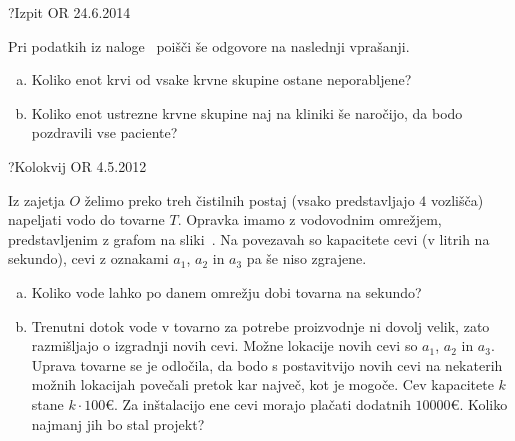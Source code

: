 \begin{naloga}{?}{Izpit OR 24.6.2014}
\begin{vprasanje}
Pri podatkih iz naloge~ poišči še odgovore na naslednji vprašanji.
\begin{enumerate}[(a)]
\item Koliko enot krvi od vsake krvne skupine ostane neporabljene?
\item Koliko enot ustrezne krvne skupine naj na kliniki še naročijo,
da bodo pozdravili vse paciente?
\end{enumerate}
\end{vprasanje}
\begin{odgovor}
\end{odgovor}
\end{naloga}


\begin{naloga}{?}{Kolokvij OR 4.5.2012}
\begin{vprasanje}[zajetje]
Iz zajetja $O$ želimo preko treh čistilnih postaj
(vsako predstavljajo $4$ vozlišča)
napeljati vodo do tovarne $T$.
Opravka imamo z vodovodnim omrežjem,
pred\-stav\-lje\-nim z grafom na sliki~\fig{}.
Na povezavah so kapacitete cevi (v litrih na sekundo),
cevi z oznakami $a_1$, $a_2$ in $a_3$ pa še niso zgrajene.

\begin{enumerate}[(a)]
\item Koliko vode lahko po danem omrežju dobi tovarna na sekundo?

\item Trenutni dotok vode v tovarno za potrebe proizvodnje ni dovolj velik,
zato razmišljajo o izgradnji novih cevi.
Možne lokacije novih cevi so $a_1$, $a_2$ in $a_3$.
Uprava tovarne se je odločila,
da bodo s postavitvijo novih cevi na nekaterih možnih lokacijah
povečali pretok kar največ, kot je mogoče.
Cev kapacitete $k$ stane $k \cdot 100 €$.
Za inštalacijo ene cevi morajo plačati dodatnih $10000 €$.
Koliko najmanj jih bo stal projekt?
\end{enumerate}

\begin{slika}
\makebox[\textwidth][c]{
\pgfslika
}
\end{slika}
\end{vprasanje}
\begin{odgovor}
\end{odgovor}
\end{naloga}



